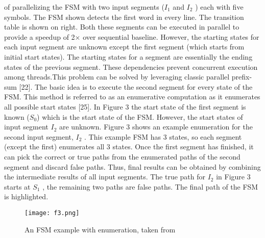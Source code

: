 of parallelizing the FSM with two input segments ($I_1$ and $I_2$ ) each
with five symbols. The FSM shown detects the first word in every
line. The transition table is shown on right. Both these segments can
be executed in parallel to provide a speedup of 2× over sequential
baseline.
However, the starting states for each input segment are unknown
except the first segment (which starts from initial start states). The
starting states for a segment are essentially the ending states of the previous segment. These dependencies prevent concurrent execution
among threads.This problem can be solved by leveraging classic
parallel prefix-sum [22]. The basic idea is to execute the second
segment for every state of the FSM. This method is referred to
as an enumerative computation as it enumerates all possible start
states [25].
In Figure 3 the start state of the first segment is known ($S_0$)
which is the start state of the FSM. However, the start states of input
segment $I_2$ are unknown. Figure 3 shows an example enumeration
for the second input segment, $I_2$ . This example FSM has 3 states,
so each segment (except the first) enumerates all 3 states. Once the
first segment has finished, it can pick the correct or true paths from
the enumerated paths of the second segment and discard false paths.
Thus, final results can be obtained by combining the intermediate
results of all input segments. The true path for $I_2$ in Figure 3 starts
at $S_1$ , the remaining two paths are false paths. The final path of the
FSM is highlighted.
\begin{figure}[!h]
    \texttt{[image: f3.png]}
    \caption{An FSM example with enumeration, taken from \cite{}}
\end{figure}